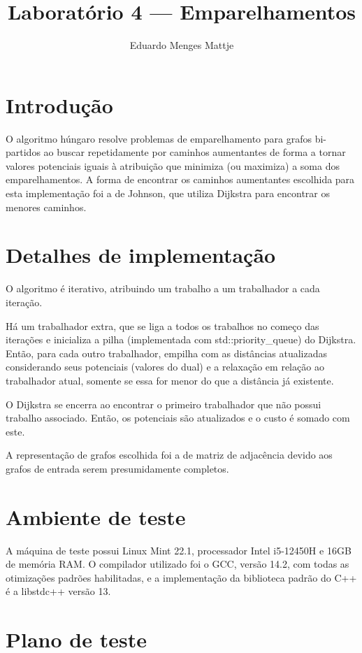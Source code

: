 \documentclass[11pt]{article}
\title{Laboratório 4 — Emparelhamentos}
\author{Eduardo Menges Mattje}
\begin{document}
\maketitle

\section{Introdução}

O algoritmo húngaro resolve problemas de emparelhamento para grafos bi-partidos ao buscar repetidamente por caminhos aumentantes de forma a tornar valores potenciais iguais à atribuição que minimiza (ou maximiza) a soma dos emparelhamentos.
A forma de encontrar os caminhos aumentantes escolhida para esta implementação foi a de Johnson, que utiliza Dijkstra para encontrar os menores caminhos.

\section{Detalhes de implementação}

O algoritmo é iterativo, atribuindo um trabalho a um trabalhador a cada iteração.

Há um trabalhador extra, que se liga a todos os trabalhos no começo das iterações e inicializa a pilha (implementada com std::priority\_queue) do Dijkstra.
Então, para cada outro trabalhador, empilha com as distâncias atualizadas considerando seus potenciais (valores do dual) e a relaxação em relação ao trabalhador atual, somente se essa for menor do que a distância já existente.

O Dijkstra se encerra ao encontrar o primeiro trabalhador que não possui trabalho associado.
Então, os potenciais são atualizados e o custo é somado com este.

A representação de grafos escolhida foi a de matriz de adjacência devido aos grafos de entrada serem presumidamente completos.

\section{Ambiente de teste}

A máquina de teste possui Linux Mint 22.1, processador Intel i5-12450H e 16GB de memória RAM.
O compilador utilizado foi o GCC, versão 14.2, com todas as otimizações padrões habilitadas, e a implementação da biblioteca padrão do C++ é a libstdc++ versão 13.

\section{Plano de teste}
\end{document}
